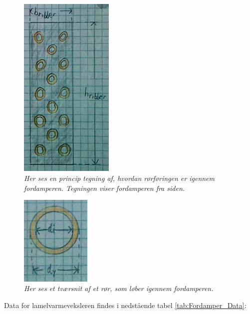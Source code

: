 \documentclass[../Hovedrapport.tex]{subfiles}
\begin{document}
\begin{figure}[H] %
	\centering
	\includegraphics[width=0.4\textwidth]{Billeder/fordamper_side.PNG}
	\caption{\textit{Her ses en princip tegning af, hvordan rørføringen er igennem fordamperen. Tegningen viser fordamperen fra siden.}}
	\label{fig:fordamp_forside}
\end{figure}

\begin{figure}[H] %
	\centering
	\includegraphics[width=0.3\textwidth]{Billeder/fordamper_roer.PNG}
	\caption{\textit{Her ses et tværsnit af et rør, som løber igennem fordamperen.}}
	\label{fig:fordamp_forside}
\end{figure}


\newpage

Data for lamelvarmeveksleren findes i nedstående tabel \ref{tab:Fordamper_Data}:
\end{document}
